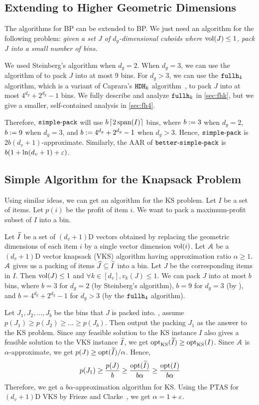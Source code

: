 \subsection{Extending to Higher Geometric Dimensions}

The algorithms for  BP can be extended to  BP.
We just need an algorithm for the following problem:
\textsl{given a set $J$ of $d_g$-dimensional cuboids where $\vol(J) \le 1$,
pack $J$ into a small number of bins.}

We used Steinberg's algorithm when $d_g = 2$.
When $d_g = 3$, we can use the algorithm of \cite[Section 2]{diedrich2008approximation}
to pack $J$ into at most 9 bins.
For $d_g > 3$, we can use the $\fhk[4]$ algorithm, which is a variant of
Caprara's $\hdhk$ algorithm~\cite{caprara2008},
to pack $J$ into at most $4^{d_g} + 2^{d_g} - 1$ bins.
We fully describe and analyze $\fhk$ in \cref{sec:fhk},
but we give a smaller, self-contained analysis in \cref{sec:fh4}.

Therefore, $\simplePack$ will use
$b\ceil{2\Span(I)}$ bins, where $b \defeq 3$ when $d_g=2$,
$b \defeq 9$ when $d_g=3$, and $b \defeq 4^{d_g}+2^{d_g}-1$ when $d_g > 3$.
Hence, $\simplePack$ is $2b(d_v+1)$-approximate.
Similarly, the AAR of $\betterSimplePack$ is $b(1 + \ln(d_v + 1) + \eps)$.

\subsection{Simple Algorithm for the Knapsack Problem}

Using similar ideas, we can get an algorithm for the  KS problem.
Let $I$ be a set of  items. Let $p(i)$ be the profit of item $i$.
We want to pack a maximum-profit subset of $I$ into a bin.

Let $\Itild$ be a set of $(d_v+1)$D vectors obtained by replacing the
geometric dimensions of each item $i$ by a single vector dimension $\vol(i)$.
Let $\Acal$ be a $(d_v+1)$D vector knapsack (VKS) algorithm
having approximation ratio $\alpha \ge 1$.
$\Acal$ gives us a packing of items $\Jhat \subseteq \Itild$ into a bin.
Let $J$ be the corresponding items in $I$.
Then $\vol(J) \le 1$ and $\forall k \in [d_v], v_k(J) \le 1$.
We can pack $J$ into at most $b$ bins, where $b=3$ for $d_g=2$ (by Steinberg's algorithm),
$b=9$ for $d_g=3$ (by \cite{diedrich2008approximation}),
and $b = 4^{d_g} + 2^{d_g} - 1$ for $d_g > 3$ (by the $\fhk[4]$ algorithm).

Let $J_1, J_2, \ldots, J_b$ be the bins that $J$ is packed into.
\WLoG, assume $p(J_1) \ge p(J_2) \ge \ldots \ge p(J_b)$. Then output the packing $J_1$
as the answer to the  KS problem.
Since any feasible solution to the  KS instance $I$ also gives a
feasible solution to the VKS instance $\Itild$, we get
$\opt_{\mathrm{KS}}(\Itild) \ge \opt_{\mathrm{KS}}(I)$.
Since $\Acal$ is $\alpha$-approximate, we get $p(J) \ge \opt(\Itild)/\alpha$. Hence,
\[ p(J_1) \ge \frac{p(J)}{b}
\ge \frac{\opt(\Itild)}{b\alpha}
\ge \frac{\opt(I)}{b\alpha} \]
Therefore, we get a $b\alpha$-approximation algorithm for  KS.
Using the PTAS for $(d_v+1)$D VKS by Frieze and Clarke~\cite{frieze1984approximation},
we get $\alpha = 1+\eps$.

